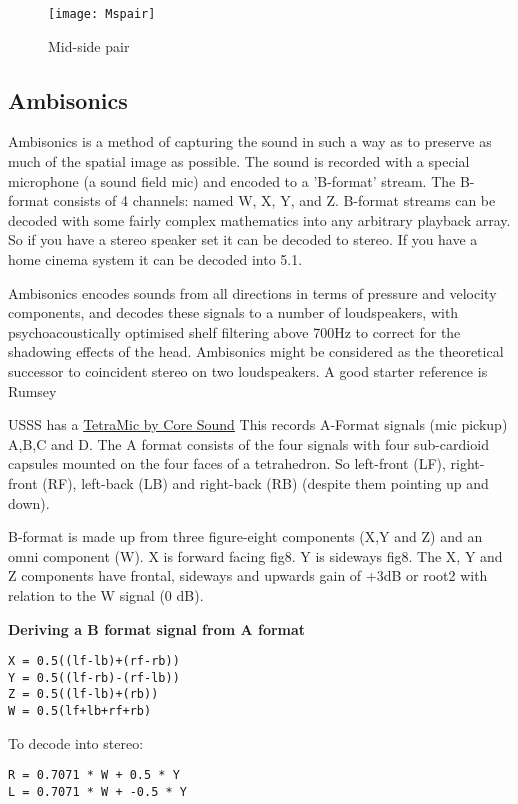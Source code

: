 \begin{figure}[H]
\centering
\texttt{[image: Mspair]}\caption{Mid-side pair}
\label{fig:midsidepair}
\end{figure}


\subsection{Ambisonics}
Ambisonics is a method of capturing the sound in such a way as to preserve as much of the spatial image as possible. The sound is recorded with a special microphone (a sound field mic) and encoded to a 'B-format' stream. The B-format consists of 4 channels: named W, X, Y, and Z. B-format streams can be decoded with some fairly complex mathematics into any arbitrary playback array. So if you have a stereo speaker set it can be decoded to stereo. If you have a home cinema system it can be decoded into 5.1.


Ambisonics encodes sounds from all directions in terms of pressure and velocity components, and decodes these signals to a number of loudspeakers, with psychoacoustically optimised shelf filtering above 700Hz to correct for the shadowing effects of the head. Ambisonics might be considered as the theoretical successor to coincident stereo on two loudspeakers. A good starter reference is Rumsey \citep[pp402-407]{rumsey2006sound} 

USSS has a \href{http://www.core-sound.com/TetraMic/1.php}{TetraMic by Core Sound}
This records A-Format signals (mic pickup) A,B,C and D. The A format consists of the four signals with four sub-cardioid capsules mounted on the four faces of a tetrahedron. So left-front (LF), right-front (RF), left-back (LB) and right-back (RB) (despite them pointing up and down). 

B-format is made up from three figure-eight components (X,Y and Z) and an omni component (W). X is forward facing fig8. Y is sideways fig8. The X, Y and Z components have frontal, sideways and upwards gain of +3dB or root2 with relation to the W signal (0 dB). 

\textbf{Deriving a B format signal from A format}
\begin{verbatim} 
X = 0.5((lf-lb)+(rf-rb))
Y = 0.5((lf-rb)-(rf-lb))
Z = 0.5((lf-lb)+(rb))
W = 0.5(lf+lb+rf+rb)
\end{verbatim} 

To decode into stereo:
\begin{verbatim} 
R = 0.7071 * W + 0.5 * Y
L = 0.7071 * W + -0.5 * Y
\end{verbatim}

